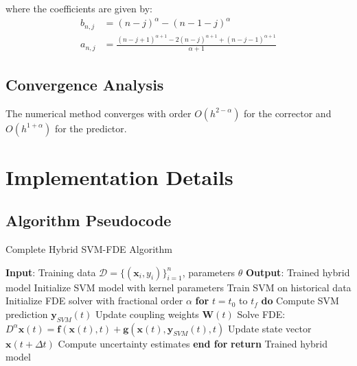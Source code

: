 \documentclass[12pt,a4paper]{report}
\begin{document}
where the coefficients are given by:
\begin{align}
b_{n,j} &= (n-j)^\alpha - (n-1-j)^\alpha \\
a_{n,j} &= \frac{(n-j+1)^{\alpha+1} - 2(n-j)^{\alpha+1} + (n-j-1)^{\alpha+1}}{\alpha+1}
\end{align}

\subsection{Convergence Analysis}

The numerical method converges with order $O(h^{2-\alpha})$ for the corrector and $O(h^{1+\alpha})$ for the predictor.

\section{Implementation Details}

\subsection{Algorithm Pseudocode}

\begin{algorithm}[H]
\caption{Complete Hybrid SVM-FDE Algorithm}
\begin{algorithmic}[1]
\STATE \textbf{Input}: Training data $\mathcal{D} = \{(\mathbf{x}_i, y_i)\}_{i=1}^n$, parameters $\theta$
\STATE \textbf{Output}: Trained hybrid model
\STATE Initialize SVM model with kernel parameters
\STATE Train SVM on historical data
\STATE Initialize FDE solver with fractional order $\alpha$
\STATE \textbf{for} $t = t_0$ to $t_f$ \textbf{do}
\STATE \quad Compute SVM prediction $\mathbf{y}_{SVM}(t)$
\STATE \quad Update coupling weights $\mathbf{W}(t)$
\STATE \quad Solve FDE: $D^\alpha \mathbf{x}(t) = \mathbf{f}(\mathbf{x}(t), t) + \mathbf{g}(\mathbf{x}(t), \mathbf{y}_{SVM}(t), t)$
\STATE \quad Update state vector $\mathbf{x}(t + \Delta t)$
\STATE \quad Compute uncertainty estimates
\STATE \textbf{end for}
\STATE \textbf{return} Trained hybrid model
\end{algorithmic}
\end{algorithm}

\printbibliography[title=References]
\end{document}
